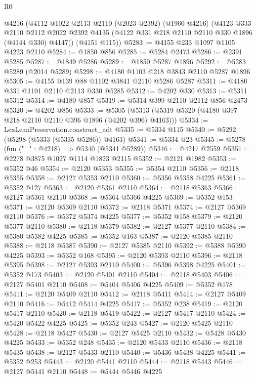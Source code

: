 \begin{lexlean}{R0}
\begin{coremodule}
    @4216
    (@4112
      @1022
      @2113
      @2110
      (@2023 @2392)
      (@1960 @4216)
      (@4123
        @333
        @2110
        @2112
        @2022
        @2392
        @4135
        (@4122 @331 @218 @2110 @2110 @330 @1896 (@4144 @330) @4147))
      (@4151 @115))
@5283 := @4155 @233 @1097 @1105 @4223 @2110
@5284 := @1850 @856
@5285 := @5284 @2473
@5286 := @2391 @5285
@5287 := @1849 @5286
@5289 := @1850 @5287 @1896
@5292 := @5283 @5289 (@2014 @5289)
@5298 := @4180 @1103 @218 @3843 @2110 @5287 @1896
@5305 := @4155 @139 @88 @1102 @3841 @2110 @5286 @5287
@5311 := @4180 @331 @1101 @2110 @2113 @330 @5285
@5312 := @4202 @330
@5313 := @5311 @5312
@5314 := @4180 @857
@5319 := @5314 @399 @2110 @2112 @856 @2473
@5320 := @4202 @856
@5333 := @5305 (@5313 (@5319 @5320 (@4180 @397 @218 @2110 @2110 @396 @1896 (@4202 @396) @4163)))
@5334 := LexLeanPreservation.construct_adt
@5335 := @5334 @115
@5340 := @5292 (@5298 (@5333 (@5335 @5286)) @4163)
@5341 := @5334 @23
@5345 := @5278 (fun ("_" : @4218) => @5340 (@5341 @5289))
@5346 := @4217 @2559
@5351 := @2278 @3875 @1027 @1114 @1823 @2115
@5352 := @2121 @1982
@5353 := @5352 @46
@5354 := @2120 @5353
@5355 := @5354 @2110
@5356 := @2118 @5355
@5358 := @2127 @5353 @2110
@5360 := @5356 @5358 @4225
@5361 := @5352 @127
@5363 := @2120 @5361 @2110
@5364 := @2118 @5363
@5366 := @2127 @5361 @2110
@5368 := @5364 @5366 @4225
@5369 := @5352 @153
@5371 := @2120 @5369 @2110
@5372 := @2118 @5371
@5374 := @2127 @5369 @2110
@5376 := @5372 @5374 @4225
@5377 := @5352 @158
@5379 := @2120 @5377 @2110
@5380 := @2118 @5379
@5382 := @2127 @5377 @2110
@5384 := @5380 @5382 @4225
@5385 := @5352 @163
@5387 := @2120 @5385 @2110
@5388 := @2118 @5387
@5390 := @2127 @5385 @2110
@5392 := @5388 @5390 @4225
@5393 := @5352 @168
@5395 := @2120 @5393 @2110
@5396 := @2118 @5395
@5398 := @2127 @5393 @2110
@5400 := @5396 @5398 @4225
@5401 := @5352 @173
@5403 := @2120 @5401 @2110
@5404 := @2118 @5403
@5406 := @2127 @5401 @2110
@5408 := @5404 @5406 @4225
@5409 := @5352 @178
@5411 := @2120 @5409 @2110
@5412 := @2118 @5411
@5414 := @2127 @5409 @2110
@5416 := @5412 @5414 @4225
@5417 := @5352 @238
@5419 := @2120 @5417 @2110
@5420 := @2118 @5419
@5422 := @2127 @5417 @2110
@5424 := @5420 @5422 @4225
@5425 := @5352 @243
@5427 := @2120 @5425 @2110
@5428 := @2118 @5427
@5430 := @2127 @5425 @2110
@5432 := @5428 @5430 @4225
@5433 := @5352 @248
@5435 := @2120 @5433 @2110
@5436 := @2118 @5435
@5438 := @2127 @5433 @2110
@5440 := @5436 @5438 @4225
@5441 := @5352 @253
@5443 := @2120 @5441 @2110
@5444 := @2118 @5443
@5446 := @2127 @5441 @2110
@5448 := @5444 @5446 @4225

\end{coremodule}
\end{lexlean}
